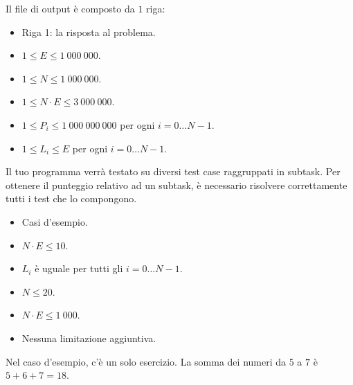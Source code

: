 Il file di output è composto da $1$ riga:
\begin{itemize}
    \item Riga 1: la risposta al problema.
\end{itemize}


\Constraints

\begin{itemize}[nolistsep, itemsep=2mm]
    \item $1 \le E \le 1\:000\:000$.
    \item $1 \le N \le 1\:000\:000$.
    \item $1 \le N \cdot E \le 3\:000\:000$.
    \item $1 \le P_i \le 1\:000\:000\:000$ per ogni $i = 0 \dots N-1$.
    \item $1 \le L_i \le E$ per ogni $i = 0 \dots N-1$.
\end{itemize}


\Scoring

Il tuo programma verrà testato su diversi test case raggruppati in subtask.
Per ottenere il punteggio relativo ad un subtask,
è necessario risolvere correttamente tutti i test che lo compongono.

\begin{itemize}[nolistsep,itemsep=2mm]
    \item \subtask Casi d'esempio.
    \item \subtask $N \cdot E \le 10$.
    \item \subtask $L_i$ è uguale per tutti gli $i = 0 \dots N-1$.
    \item \subtask $N \le 20$.
    \item \subtask $N \cdot E \le 1\:000$.
    \item \subtask Nessuna limitazione aggiuntiva.
\end{itemize}


\Examples

\begin{example}
\end{example}


\Explanation

Nel caso d'esempio, c'è un solo esercizio. La somma dei numeri da $5$ a $7$ è $5+6+7 = 18$.
